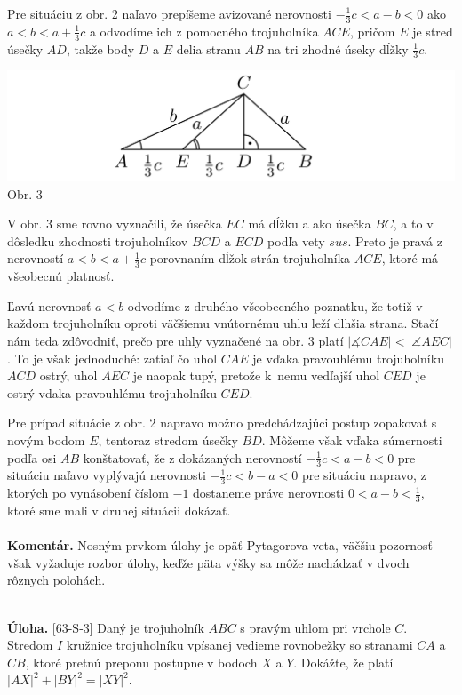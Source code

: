 \documentclass[11pt,a4paper,oneside,final]{book}
\newcommand{\kom}{\textbf{Komentár.} }
\newcommand{\ul}{\textbf{Úloha.} }
\newcommand{\ma}{\measuredangle}
\begin{document}
Pre situáciu z obr. 2 naľavo prepíšeme avizované nerovnosti $-\frac{1}{3}c < a - b < 0$ ako $a < b < a +\frac{1}{3}c$ a odvodíme ich z pomocného trojuholníka $ACE$, pričom $E$ je stred úsečky $AD$, takže body $D$ a $E$ delia stranu $AB$ na tri zhodné úseky dĺžky $\frac{1}{3}c$.
\begin{center}
\includegraphics[scale=0.3]{66D32}\\

Obr. 3
\end{center}
V obr. 3 sme rovno vyznačili, že úsečka $EC$ má dĺžku a ako úsečka $BC$, a to v dôsledku zhodnosti trojuholníkov $BCD$ a $ECD$ podľa vety $sus$. Preto je pravá z nerovností $a < b < a +\frac{1}{3}c$ porovnaním dĺžok strán trojuholníka $ACE$, ktoré má všeobecnú platnosť.

Ľavú nerovnosť $a < b$ odvodíme z druhého všeobecného poznatku, že totiž v každom trojuholníku oproti väčšiemu vnútornému uhlu leží dlhšia strana. Stačí nám teda zdôvodniť, prečo pre uhly vyznačené na obr. 3 platí $|\ma CAE| < |\ma AEC|$. To je však jednoduché: zatiaľ čo uhol $CAE$ je vďaka pravouhlému trojuholníku $ACD$ ostrý, uhol $AEC$ je naopak tupý, pretože k~nemu vedľajší uhol $CED$ je ostrý vďaka pravouhlému trojuholníku $CED$.

Pre prípad situácie z obr. 2 napravo možno predchádzajúci postup zopakovať s novým bodom $E$, tentoraz stredom úsečky $BD$. Môžeme však vďaka súmernosti podľa osi $AB$ konštatovať, že z dokázaných nerovností $-\frac{1}{3}c < a - b < 0$ pre situáciu naľavo vyplývajú nerovnosti $-\frac{1}{3}c < b - a < 0$ pre situáciu napravo, z ktorých po vynásobení číslom $-1$ dostaneme práve nerovnosti $0 < a - b <\frac{1}{3}$, ktoré sme mali v druhej situácii dokázať.\\
\\
\kom Nosným prvkom úlohy je opäť Pytagorova veta, väčšiu pozornosť však vyžaduje rozbor úlohy, keďže päta výšky sa môže nachádzať v dvoch rôznych polohách.\\
\\
\begin{tcolorbox}[breakable,notitle,boxrule=0pt,colback=light-gray,colframe=light-gray]\ul [63-S-3]
Daný je trojuholník $ABC$ s pravým uhlom pri vrchole $C$. Stredom $I$ kružnice trojuholníku vpísanej vedieme rovnobežky so stranami $CA$ a $CB$, ktoré pretnú preponu postupne v bodoch $X$ a $Y$. Dokážte, že platí $|AX|^2 + |BY |^2 = |XY |^2$.

\end{tcolorbox}
\end{document}
